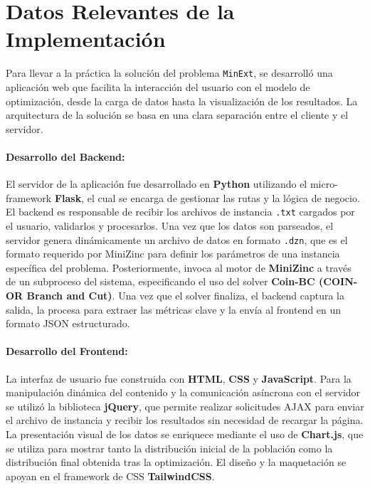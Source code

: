 \documentclass[11pt,letter]{article}
\begin{document}
\section{Datos Relevantes de la Implementación}

Para llevar a la práctica la solución del problema \texttt{MinExt}, se desarrolló una aplicación web que facilita la interacción del usuario con el modelo de optimización, desde la carga de datos hasta la visualización de los resultados. La arquitectura de la solución se basa en una clara separación entre el cliente y el servidor.

\paragraph{Desarrollo del Backend:} El servidor de la aplicación fue desarrollado en \textbf{Python} utilizando el micro-framework \textbf{Flask}, el cual se encarga de gestionar las rutas y la lógica de negocio. El backend es responsable de recibir los archivos de instancia \texttt{.txt} cargados por el usuario, validarlos y procesarlos. Una vez que los datos son parseados, el servidor genera dinámicamente un archivo de datos en formato \texttt{.dzn}, que es el formato requerido por MiniZinc para definir los parámetros de una instancia específica del problema. Posteriormente, invoca al motor de \textbf{MiniZinc} a través de un subproceso del sistema, especificando el uso del solver \textbf{Coin-BC (COIN-OR Branch and Cut)}. Una vez que el solver finaliza, el backend captura la salida, la procesa para extraer las métricas clave y la envía al frontend en un formato JSON estructurado.

\paragraph{Desarrollo del Frontend:} La interfaz de usuario fue construida con \textbf{HTML}, \textbf{CSS} y \textbf{JavaScript}. Para la manipulación dinámica del contenido y la comunicación asíncrona con el servidor se utilizó la biblioteca \textbf{jQuery}, que permite realizar solicitudes AJAX para enviar el archivo de instancia y recibir los resultados sin necesidad de recargar la página. La presentación visual de los datos se enriquece mediante el uso de \textbf{Chart.js}, que se utiliza para mostrar tanto la distribución inicial de la población como la distribución final obtenida tras la optimización. El diseño y la maquetación se apoyan en el framework de CSS \textbf{TailwindCSS}.
\end{document}
